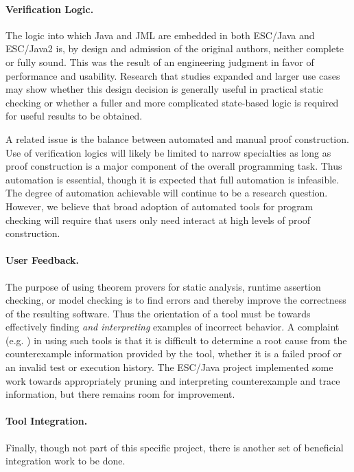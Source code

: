 \documentclass{sig-alternate}
\begin{document}
\paragraph*{Verification Logic.} The logic into which Java and JML are
embedded in both ESC/Java and ESC/Java2 is, by design and admission of the original
authors, neither complete or fully sound.  This was the result of an
engineering judgment in favor of performance and usability.  Research
that studies expanded and larger use cases may show whether this
design decision is generally useful in practical static checking or
whether a fuller and more complicated state-based logic is required
for useful results to be obtained. 

A related issue is the balance between automated and manual proof construction.
Use of verification logics will likely be limited to narrow specialties as long as proof
construction is a major component of the overall programming task.  Thus automation
is essential, though it is expected that full automation is infeasible.  The degree of
automation achievable will continue to be a research question. 
However, we believe that broad adoption of automated tools for program checking 
will require that users only need interact at high levels of proof construction.

\paragraph*{User Feedback.} The purpose of using theorem provers for
static analysis, runtime assertion checking, or model checking is to
find errors and thereby improve the correctness of the resulting
software.  Thus the orientation of a tool must be towards effectively
finding {\em and interpreting} examples of incorrect behavior.  A
complaint (e.g. \cite{GroceVisser03}) in using such tools is that it is difficult
to determine a root cause from the counterexample information provided
by the tool, whether it is a failed proof or an invalid test or
execution history.  The ESC/Java project implemented some work towards
appropriately pruning and interpreting counterexample and trace information, but
there remains room for improvement.

\paragraph*{Tool Integration.} Finally, though not part of this specific
project, there is another set of beneficial integration work to be
done.
\end{document}
